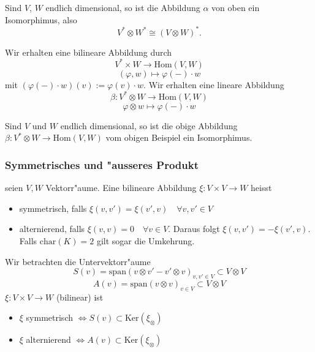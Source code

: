 \documentclass[9pt, a4paper, twocolumn, landscape]{article}
\begin{document}
{{\begin{example}
\end{example}


\begin{theorem}
Sind $V$, $W$ endlich dimensional, so ist die Abbildung $\alpha$ von oben ein Isomorphimus, also 
$$
V^* \otimes W^* \cong (V \otimes W)^*.
$$
\end{theorem}

\begin{example}
Wir erhalten eine bilineare Abbildung durch 
$$
V^* \times W \rightarrow \mathrm{Hom}(V,W)
$$
$$
(\varphi, w) \mapsto \varphi (-) \cdot w
$$
mit  $ (\varphi (-) \cdot w) (v) := \varphi (v) \cdot w$.
Wir erhalten eine lineare Abbildung 
$$
\beta: V^* \otimes W \rightarrow \mathrm{Hom}(V, W)
$$
$$
\varphi \otimes w \mapsto \varphi (-) \cdot w
$$
\end{example}

\begin{theorem}
Sind $V$ und $W$ endlich dimensional, so ist die obige Abbildung $\beta:V^* \otimes W \rightarrow \mathrm{Hom}(V, W)$ vom obigen Beispiel ein Isomorphimus. 
\end{theorem}
}


\subsubsection{Symmetrisches und "ausseres Produkt}
\begin{definition}
seien $V, W$ Vektorr"aume.
Eine bilineare Abbildung 
$
\xi : V \times V \rightarrow W
$
heisst 
\begin{itemize}
\item symmetrisch, falls $\xi( v, v') = \xi (v', v) \quad \forall v, v' \in V$
\item alternierend, falls $\xi (v, v) = 0 \quad \forall v \in V$. Daraus folgt $\xi(v, v') = - \xi(v' ,v)$. Falls  $\mathrm{char}(K) = 2$ gilt  sogar die Umkehrung.
\end{itemize}
\end{definition}
\begin{lemma}
Wir betrachten die Untervektorr"aume 
$$
S(v) = \mathrm{span} (v \otimes v' - v' \otimes v)_{v, v' \in V} \subset V \otimes V
$$
$$
A(v) =  \mathrm{span} (v \otimes v)_{v \in V} \subset V \otimes V
$$
$\xi : V \times V \rightarrow W$ (bilinear) ist 
\begin{itemize}
\item $\xi$ symmetrisch $\Leftrightarrow S(v) \subset \mathrm{Ker}(\xi_\otimes)$
\item $\xi$ alternierend $\Leftrightarrow A(v) \subset \mathrm{Ker}(\xi_\otimes)$
\end{itemize}
\end{lemma}


}
\end{document}
